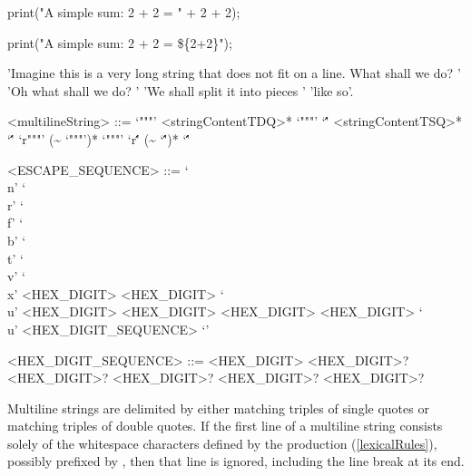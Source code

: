\documentclass[makeidx]{article}
\begin{document}
\begin{dartCode}
print("A simple sum: 2 + 2 = " +
            2 + 2);
\end{dartCode}


\begin{dartCode}
print("A simple sum: 2 + 2 = \$\{2+2\}");
\end{dartCode}


\begin{dartCode}
'Imagine this is a very long string that does not fit on a line. What shall we do? '
'Oh what shall we do? '
'We shall split it into pieces '
'like so'.
\end{dartCode}

\begin{grammar}
<multilineString> ::= `"""' <stringContentTDQ>* `"""'
  \alt `\'\mbox\'\mbox\'' <stringContentTSQ>* `\'\mbox\'\mbox\''
  \alt `r"""' (\~{} `"""')* `"""'
  \alt `r\'\mbox\'\mbox\'' (\~{} `\'\mbox\'\mbox\'')* `\'\mbox\'\mbox\''

<ESCAPE\_SEQUENCE> ::= `\\n'
  \alt `\\r'
  \alt `\\f'
  \alt `\\b'
  \alt `\\t'
  \alt `\\v'
  \alt `\\x' <HEX\_DIGIT> <HEX\_DIGIT>
  \alt `\\u' <HEX\_DIGIT> <HEX\_DIGIT> <HEX\_DIGIT> <HEX\_DIGIT>
  \alt `\\u{' <HEX\_DIGIT\_SEQUENCE> `}'

<HEX\_DIGIT\_SEQUENCE> ::= \gnewline{}
  <HEX\_DIGIT> <HEX\_DIGIT>? <HEX\_DIGIT>?
  \gnewline{} <HEX\_DIGIT>? <HEX\_DIGIT>? <HEX\_DIGIT>?
\end{grammar}

\LMHash{}%
Multiline strings are delimited by either matching triples of single quotes or matching triples of double quotes.
If the first line of a multiline string consists solely of the whitespace characters defined by the production  (\ref{lexicalRules}), possibly prefixed by , then that line is ignored, including the line break at its end.
\end{document}
